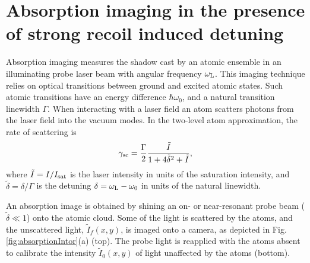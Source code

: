 \documentclass[12pt]{iopart}
\begin{document}
\section{Absorption imaging in the presence of strong recoil induced detuning}
\label{sec:2}
Absorption imaging measures the shadow cast by an atomic ensemble in an illuminating probe laser beam with angular frequency $\omega_{\rm{L}}$. This imaging technique relies on optical transitions between ground and excited atomic states. Such atomic transitions have an energy difference $\hbar\omega_0$, and a natural transition linewidth $\Gamma$. When interacting with a laser field an atom scatters photons from the laser field into the vacuum modes. In the two-level atom approximation, the rate of scattering is \cite{LCT}
\begin{equation}
\gamma_{\rm{sc}}= \frac{\Gamma}{2} \frac{\tilde{I}}{1+4\tilde{\delta}^2 +\tilde{I}},
\label{eq:scatrate}
\end{equation}
where $\tilde{I}=I/I_{\rm{sat}}$ is the laser intensity in units of the saturation intensity, and $\tilde{\delta}=\delta/\Gamma$ is the detuning $\delta=\omega_{\rm{L}}-\omega_0$ in units of the natural linewidth. 
\par An absorption image is obtained by shining an on- or near-resonant probe beam ($\tilde{\delta}\ll1$) onto the atomic cloud. Some of the light is scattered by the atoms, and the unscattered light, $\tilde{I}_f(x,y)$, is imaged onto a camera, as depicted in Fig. \ref{fig:absorptionIntor}(a) (top). The probe light is reapplied with the atoms absent to calibrate the intensity $\tilde{I}_0(x,y)$ of light unaffected by the atoms (bottom).
\end{document}
